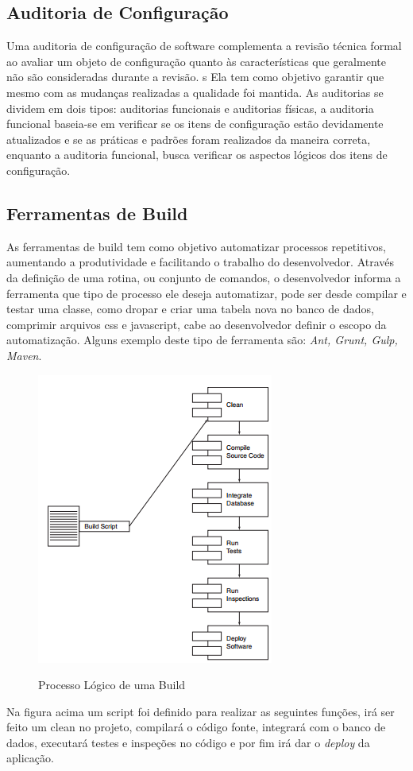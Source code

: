 \subsection{Auditoria de Configuração}
Uma auditoria de configuração de software complementa a revisão técnica formal ao avaliar um objeto de configuração quanto às características que geralmente não são consideradas durante a revisão. s Ela tem como objetivo garantir que mesmo com as mudanças realizadas a qualidade foi mantida. As auditorias se dividem em dois tipos: auditorias funcionais e auditorias físicas, a auditoria funcional baseia-se em verificar se os itens de configuração estão devidamente atualizados e se as práticas e padrões foram realizados da maneira correta, enquanto a auditoria funcional, busca verificar os aspectos lógicos dos itens de configuração.
\subsection{Ferramentas de Build}
As ferramentas de build tem como objetivo automatizar processos repetitivos, aumentando a produtividade e facilitando o trabalho do desenvolvedor. Através da definição de uma rotina, ou conjunto de comandos, o desenvolvedor informa a ferramenta que tipo de processo ele deseja automatizar, pode ser desde compilar e testar uma classe, como dropar e criar uma tabela nova no banco de dados, comprimir arquivos css e javascript, cabe ao desenvolvedor definir o escopo da automatização. Alguns exemplo deste tipo de ferramenta são: \textit{Ant, Grunt, Gulp, Maven}.


\begin{figure}[h]
\centering
\caption[Processo Lógico de uma Build]{Processo Lógico de uma Build}
\includegraphics[width=0.5\linewidth]{./images/build}
\label{fig:build}
\end{figure}
Na figura acima um script foi definido para realizar as seguintes funções, irá ser feito um clean no projeto, compilará o código fonte, integrará com o banco de dados, executará testes e inspeções no código e por fim irá dar o \textit{deploy} da aplicação.


